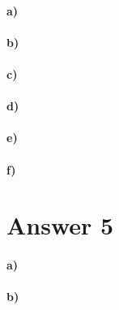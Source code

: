 \documentclass[12pt]{article}
\newcommand\+{\mkern2mu}
\begin{document}
\paragraph{a)} %
\paragraph{b)} %
\paragraph{c)}
\paragraph{d)}
\paragraph{e)}
\paragraph{f)}

\section*{Answer 5}
\paragraph{a)}
\paragraph{b)}
\end{document}

